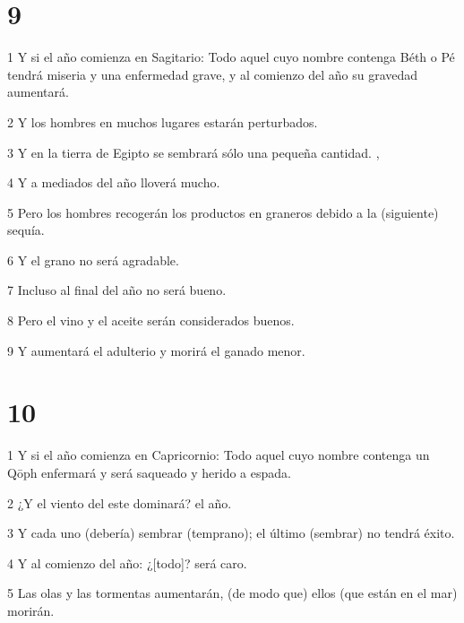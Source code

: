 \chapter{9}

\par 1 Y si el año comienza en Sagitario: Todo aquel cuyo nombre contenga Béth o Pé tendrá miseria y una enfermedad grave, y al comienzo del año su gravedad aumentará.

\par 2 Y los hombres en muchos lugares estarán perturbados.

\par 3 Y en la tierra de Egipto se sembrará sólo una pequeña cantidad. ,

\par 4 Y a mediados del año lloverá mucho.

\par 5 Pero los hombres recogerán los productos en graneros debido a la (siguiente) sequía.

\par 6 Y el grano no será agradable.

\par 7 Incluso al final del año no será bueno.

\par 8 Pero el vino y el aceite serán considerados buenos.

\par 9 Y aumentará el adulterio y morirá el ganado menor.

\chapter{10}

\par 1 Y si el año comienza en Capricornio: Todo aquel cuyo nombre contenga un Qōph enfermará y será saqueado y herido a espada.

\par 2 ¿Y el viento del este dominará? el año.

\par 3 Y cada uno (debería) sembrar (temprano); el último (sembrar) no tendrá éxito.

\par 4 Y al comienzo del año: ¿[todo]? será caro.

\par 5 Las olas y las tormentas aumentarán, (de modo que) ellos (que están en el mar) morirán.

